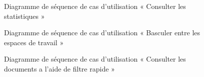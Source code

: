 \begin{figure}[H]
  \centering
  \caption{Diagramme de séquence de cas d'utilisation « Consulter les statistiques »}
  \label{fig:sequence_view_stats}
\end{figure}

\begin{figure}[H]
  \centering
  \caption{Diagramme de séquence de cas d'utilisation « Basculer entre les espaces de travail »}
  \label{fig:sequence_switch_workspace}
\end{figure}

\begin{figure}[H]
  \centering
  \caption{Diagramme de séquence de cas d'utilisation « Consulter les documents a l'aide de filtre rapide »}
  \label{fig:sequence_docs_quick_filter}
\end{figure}

